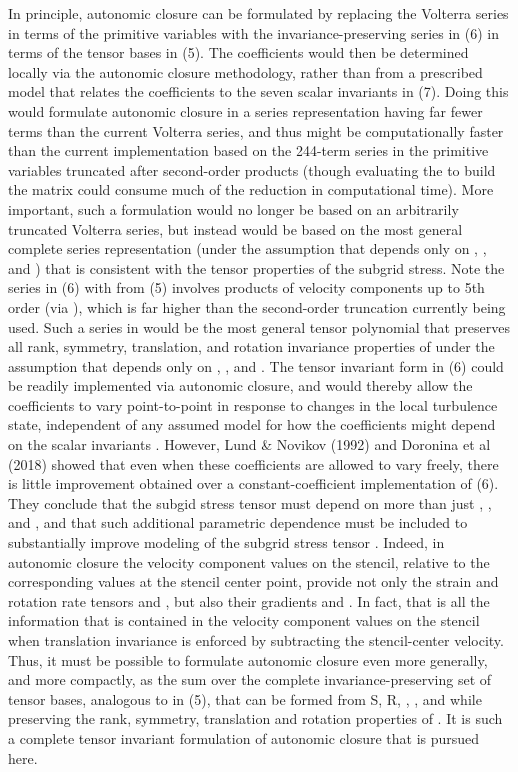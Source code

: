 In principle, autonomic closure can be formulated by replacing the Volterra series in terms of the primitive variables   with the invariance-preserving series in (6) in terms of the tensor bases   in (5). The coefficients   would then be determined locally via the autonomic closure methodology, rather than from a prescribed model that relates the coefficients to the seven scalar invariants   in (7). Doing this would formulate autonomic closure in a series representation having far fewer terms than the current Volterra series, and thus might be computationally faster than the current implementation based on the 244-term series in the primitive variables truncated after second-order products (though evaluating the   to build the  matrix could consume much of the reduction in computational time). More important, such a formulation would no longer be based on an arbitrarily truncated Volterra series, but instead would be based on the most general complete series representation (under the assumption that   depends only on  ,  , and  ) that is consistent with the tensor properties of the subgrid stress. 
Note the series in (6) with   from (5) involves products of velocity components up to 5th order (via  ), which is far higher than the second-order truncation currently being used. Such a series in   would be the most general tensor polynomial that preserves all rank, symmetry, translation, and rotation invariance properties of   under the assumption that   depends only on  ,  , and  .
The tensor invariant form in (6) could be readily implemented via autonomic closure, and would thereby allow the coefficients   to vary point-to-point in response to changes in the local turbulence state, independent of any assumed model for how the coefficients might depend on the scalar invariants  . However, Lund & Novikov (1992) and Doronina et al (2018) showed that even when these coefficients are allowed to vary freely, there is little improvement obtained over a constant-coefficient implementation of (6). They conclude that the subgid stress tensor must depend on more than just  ,  , and  , and that such additional parametric dependence must be included to substantially improve modeling of the subgrid stress tensor  .
Indeed, in autonomic closure the velocity component values on the   stencil, relative to the corresponding values at the stencil center point, provide not only the strain and rotation rate tensors   and  , but also their gradients   and  . In fact, that is all the information that is contained in the velocity component values on the   stencil when translation invariance is enforced by subtracting the stencil-center velocity. Thus, it must be possible to formulate autonomic closure even more generally, and more compactly, as the sum over the complete invariance-preserving set of tensor bases, analogous to   in (5), that can be formed from S, R,  ,  , and   while preserving the rank, symmetry, translation and rotation properties of  . It is such a complete tensor invariant formulation of autonomic closure that is pursued here. 

